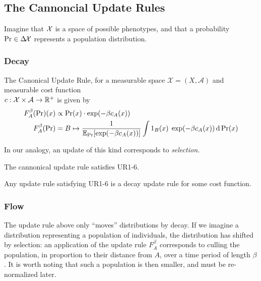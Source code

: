 \documentclass{article}
\begin{document}
\subsection{The Cannoncial Update Rules}
Imagine that $\mathcal X$ is a space of possible phenotypes, and that a probability $\Pr \in \Delta\!\mathcal X$ represents a population distribution.

\subsubsection{Decay}
The Canonical Update Rule, for a measurable space $\mathcal X = (X, \mathcal A)$ and measurable cost function\\
$c: \mathcal X\times\mathcal A \to \mathbb R^+$ is given by
\def\cost#1#2{c_{#2}(#1)}
\begin{align*}
    F^\beta_A(\Pr)(x) &\propto \Pr(x) \cdot \exp(-\beta \cost xA) \\
    F^\beta_A(\Pr) &= B \mapsto \frac{1}{\Ex_{\Pr}[\exp(-\beta \cost xA )]}
        \int 1_B(x) \; \exp(-\beta \cost xA ) \,\mathrm d\Pr(x)
\end{align*}

In our analogy, an update of this kind corresponds to \emph{selection}.

\begin{prop}
    The cannonical update rule satisfies UR1-6.
\end{prop}


\begin{conj}
    Any update rule satisfying UR1-6 is a decay update rule for some cost function.
\end{conj}


\subsubsection{Flow}
\def\vgrad{\boldsymbol\nabla}
The update rule above only ``moves'' distributions by decay. If we imagine a distribution representing a population of individuals, the distribution has shifted by selection: an application of the update rule $F_A^\beta$ corresponds to culling the population, in proportion to their distance from $A$, over a time period of length $\beta$.
It is worth noting that such a population is then smaller, and must be re-normalized later.
\end{document}
